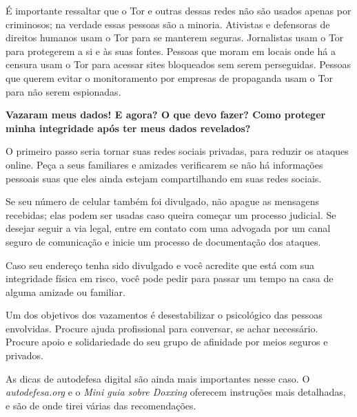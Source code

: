 É importante ressaltar que o Tor e outras dessas redes não são usados
apenas por criminosos; na verdade essas pessoas são a minoria. Ativistas
e defensoras de direitos humanos usam o Tor para se manterem seguras.
Jornalistas usam o Tor para protegerem a si e às suas fontes. Pessoas que
moram em locais onde há a censura usam o Tor para acessar sites
bloqueados sem serem perseguidas. Pessoas que querem evitar o
monitoramento por empresas de propaganda usam o Tor para não serem
espionadas.

\bigskip

\noindent{}\textbf{Vazaram meus dados! E agora? O que devo fazer? Como proteger
minha integridade após ter meus dados revelados?}

O primeiro passo seria tornar suas redes sociais
privadas, para reduzir os ataques online. Peça a seus familiares e
amizades verificarem se não há informações pessoais suas que eles ainda
estejam compartilhando em suas redes sociais.

Se seu número de celular também foi divulgado, não apague as mensagens
recebidas; elas podem ser usadas caso queira começar um processo
judicial. Se desejar seguir a via legal, entre em contato com uma
advogada por um canal seguro de comunicação e inicie um processo de
documentação dos ataques.

Caso seu endereço tenha sido divulgado e você acredite que está com sua
integridade física em risco, você pode pedir para passar um tempo na
casa de alguma amizade ou familiar.

Um dos objetivos dos vazamentos é desestabilizar o psicológico das
pessoas envolvidas. Procure ajuda profissional para conversar, se achar
necessário. Procure apoio e solidariedade do seu grupo de afinidade por
meios seguros e privados.

As dicas de autodefesa digital são ainda mais importantes nesse caso. O
\emph{autodefesa.org} e o \emph{Mini guia sobre Doxxing} oferecem instruções mais
detalhadas, e são de onde tirei várias das recomendações.

%
%
%
%
%
%
%
%
%
%
%
%
%
%

